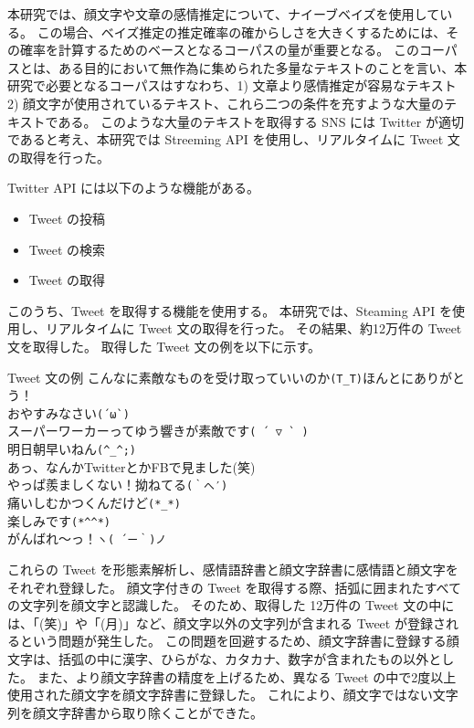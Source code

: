 \documentclass[11pt,a4j]{jsarticle}
\begin{document}
本研究では、顔文字や文章の感情推定について、ナイーブベイズを使用している。
この場合、ベイズ推定の推定確率の確からしさを大きくするためには、その確率を計算するためのベースとなるコーパスの量が重要となる。
このコーパスとは、ある目的において無作為に集められた多量なテキストのことを言い、本研究で必要となるコーパスはすなわち、1) 文章より感情推定が容易なテキスト 2) 顔文字が使用されているテキスト、これら二つの条件を充すような大量のテキストである。
このような大量のテキストを取得する SNS には Twitter が適切であると考え、本研究では Streeming API を使用し、リアルタイムに Tweet 文の取得を行った。

Twitter API には以下のような機能がある。

\begin{itemize}
  \item Tweet の投稿
  \item Tweet の検索
  \item Tweet の取得
\end{itemize}

このうち、Tweet を取得する機能を使用する。
本研究では、Steaming API を使用し、リアルタイムに Tweet 文の取得を行った。
その結果、約12万件の Tweet 文を取得した。
取得した Tweet 文の例を以下に示す。

\begin{itembox}[c]{Tweet 文の例}
  こんなに素敵なものを受け取っていいのか\verb|(T_T)|ほんとにありがとう！\\
  おやすみなさい\verb|(´ω`)| \\
  スーパーワーカーってゆう響きが素敵です\verb|( ´ ▽ ` )| \\
  明日朝早いねん\verb|(^_^;)| \\
  あっ、なんかTwitterとかFBで見ました(笑)\\
  やっぱ羨ましくない！拗ねてる\verb|(｀へ′)| \\
  痛いしむかつくんだけど\verb|(*_*)| \\
  楽しみです\verb|(*^^*)| \\
  がんばれ〜っ！\verb|ヽ( ´ー｀)ノ|\\
\end{itembox}

これらの Tweet を形態素解析し、感情語辞書と顔文字辞書に感情語と顔文字をそれぞれ登録した。
顔文字付きの Tweet を取得する際、括弧に囲まれたすべての文字列を顔文字と認識した。
そのため、取得した 12万件の Tweet 文の中には、「(笑)」や「(月)」など、顔文字以外の文字列が含まれる Tweet が登録されるという問題が発生した。
この問題を回避するため、顔文字辞書に登録する顔文字は、括弧の中に漢字、ひらがな、カタカナ、数字が含まれたもの以外とした。
また、より顔文字辞書の精度を上げるため、異なる Tweet の中で2度以上使用された顔文字を顔文字辞書に登録した。
これにより、顔文字ではない文字列を顔文字辞書から取り除くことができた。
\end{document}
